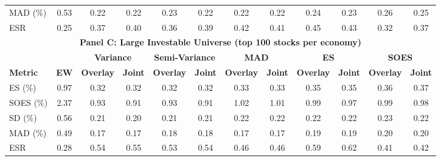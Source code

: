 \begin{tabular}{l*{11}{c}}
    MAD (\%) & 0.53 & 0.22 & 0.22 & 0.23 & 0.22 & 0.22 & 0.22 & 0.24 & 0.23 & 0.26 & 0.25 \\
    ESR & 0.25 & 0.37 & 0.40 & 0.36 & 0.39 & 0.42 & 0.41 & 0.45 & 0.43 & 0.32 & 0.37 \\
    \midrule
    \multicolumn{12}{c}{\textbf{Panel C: Large Investable Universe (top 100 stocks per economy)}} \\
    \midrule
    & & \multicolumn{2}{c}{\textbf{Variance}} & \multicolumn{2}{c}{\textbf{Semi-Variance}} & \multicolumn{2}{c}{\textbf{MAD}} & \multicolumn{2}{c}{\textbf{ES}} & \multicolumn{2}{c}{\textbf{SOES}} \\
    \cmidrule(lr){3-4} \cmidrule(lr){5-6} \cmidrule(lr){7-8} \cmidrule(lr){9-10} \cmidrule(lr){11-12}
    \textbf{Metric} & \textbf{EW} & \textbf{Overlay} & \textbf{Joint} & \textbf{Overlay} & \textbf{Joint} & \textbf{Overlay} & \textbf{Joint} & \textbf{Overlay} & \textbf{Joint} & \textbf{Overlay} & \textbf{Joint} \\
    \midrule
    ES (\%) & 0.97 & 0.32 & 0.32 & 0.32 & 0.32 & 0.33 & 0.33 & 0.35 & 0.35 & 0.36 & 0.37 \\
    SOES (\%) & 2.37 & 0.93 & 0.91 & 0.93 & 0.91 & 1.02 & 1.01 & 0.99 & 0.97 & 0.99 & 0.98 \\
    SD (\%) & 0.56 & 0.21 & 0.20 & 0.21 & 0.21 & 0.22 & 0.22 & 0.22 & 0.22 & 0.23 & 0.22 \\
    MAD (\%) & 0.49 & 0.17 & 0.17 & 0.18 & 0.18 & 0.17 & 0.17 & 0.19 & 0.19 & 0.20 & 0.20 \\
    ESR & 0.28 & 0.54 & 0.55 & 0.53 & 0.54 & 0.46 & 0.46 & 0.59 & 0.62 & 0.41 & 0.42 \\
    \bottomrule
  \end{tabular}
